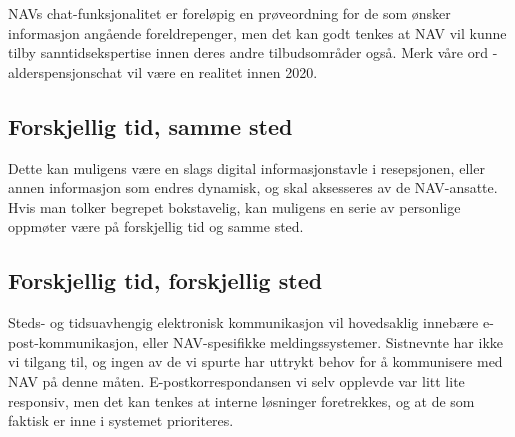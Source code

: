 \documentclass[informationsecurity]{gucmasterproject}
\begin{document}
NAVs chat-funksjonalitet er foreløpig en prøveordning for de som ønsker informasjon angående foreldrepenger, men det kan godt tenkes at NAV vil kunne tilby sanntidsekspertise innen deres andre tilbudsområder også. Merk våre ord - alderspensjonschat vil være en realitet innen 2020.

\subsection{Forskjellig tid, samme sted}
Dette kan muligens være en slags digital informasjonstavle i resepsjonen, eller annen informasjon som endres dynamisk, og skal aksesseres av de NAV-ansatte. Hvis man tolker begrepet bokstavelig, kan muligens en serie av personlige oppmøter være på forskjellig tid og samme sted.

\subsection{Forskjellig tid, forskjellig sted}
Steds- og tidsuavhengig elektronisk kommunikasjon vil hovedsaklig innebære e-post-kommunikasjon, eller NAV-spesifikke meldingssystemer. Sistnevnte har ikke vi tilgang til, og ingen av de vi spurte har uttrykt behov for å kommunisere med NAV på denne måten. E-postkorrespondansen vi selv opplevde var litt lite responsiv, men det kan tenkes at interne løsninger foretrekkes, og at de som faktisk er inne i systemet prioriteres.
\end{document}
